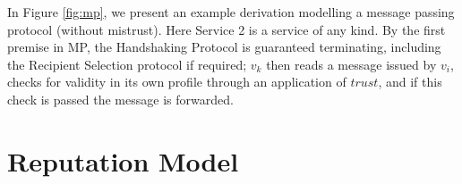 \documentclass[compsoc, conference, letterpaper, 10pt, times]{IEEEtran}
\begin{document}

In Figure \ref{fig:mp}, we present an example derivation modelling a message passing protocol (without mistrust). Here Service 2 is a service of any kind. By the first premise in MP, the Handshaking Protocol is guaranteed terminating, including the Recipient Selection protocol if required; $v_{k}$ then reads a message issued by $v_{i}$, checks for validity in its own profile through an application of $trust$, and if this check is passed the message is forwarded.



\begin{figure*}
	\begin{prooftree}
		\end{prooftree}

	\caption{The Message Passing Protocol}\label{fig:mp}
\end{figure*}



\section{Reputation Model}\label{sec:reputation}
\end{document}
